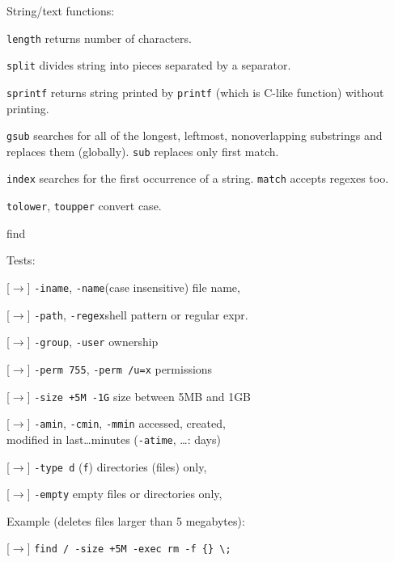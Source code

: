 String/text functions:
\begin{compactenum}
\item \texttt{length} returns number of characters.
\item \texttt{split} divides string into pieces separated by a separator.
\item \texttt{sprintf} returns string printed by \texttt{printf} (which is C-like function) without printing.
\item \texttt{gsub} searches for all of the longest, leftmost, nonoverlapping substrings and replaces them (globally). \texttt{sub} replaces only first match.
\item \texttt{index} searches for the first occurrence of a string. \texttt{match} accepts regexes too.
\item \texttt{tolower}, \texttt{toupper} convert case.
\end{compactenum}


find

Tests:

[$\to$]  \texttt{-iname}, \texttt{-name}\hfill (case insensitive) file name,

[$\to$]  \texttt{-path}, \texttt{-regex}\hfill shell pattern or regular expr.

[$\to$] \texttt{-group}, \texttt{-user} \hfill ownership

[$\to$] \texttt{-perm 755}, \texttt{-perm /u=x} \hfill permissions

[$\to$] \texttt{-size +5M -1G} \hfill size between 5MB and 1GB

[$\to$] \texttt{-amin}, \texttt{-cmin}, \texttt{-mmin} accessed, created, \\modified in last\dots minutes (\texttt{-atime}, \dots: days)

[$\to$] \texttt{-type d} (\texttt{f}) \hfill directories (files) only,

[$\to$] \texttt{-empty} \hfill empty files or directories only,

Example (deletes files larger than 5 megabytes): 

[$\to$] \texttt{find / -size +5M -exec rm -f \{\} \textbackslash{};}

